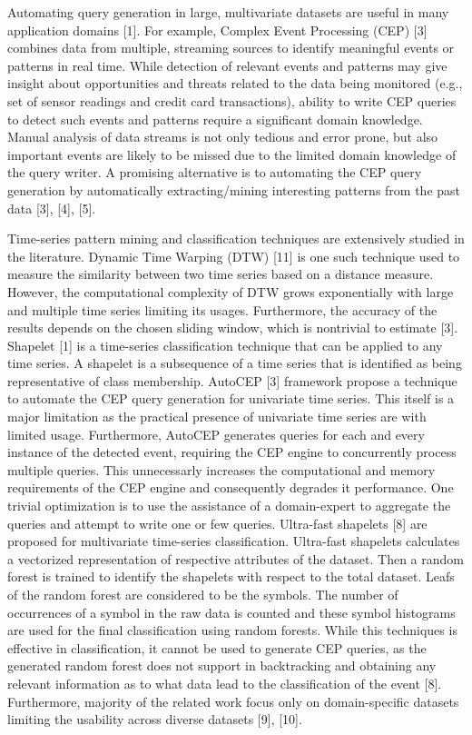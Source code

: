 \documentclass[conference]{IEEEtran}  %
\begin{document}
Automating query generation in large, multivariate datasets are useful in many application domains [1]. For example, Complex Event Processing (CEP) [3] combines data from multiple, streaming sources to identify meaningful events or patterns in real time. While detection of relevant events and patterns may give insight about opportunities and threats related to the data being monitored (e.g., set of sensor readings and credit card transactions), ability to write CEP queries to detect such events and patterns require a significant domain knowledge. Manual analysis of data streams is not only tedious and error prone, but also important events are likely to be missed due to the limited domain knowledge of the query writer. A promising alternative is to automating the CEP query generation by automatically extracting/mining interesting patterns from the past data [3], [4], [5].

Time-series pattern mining and classification techniques are extensively studied in the literature. Dynamic Time Warping (DTW) [11] is one such technique used to measure the similarity between two time series based on a distance measure. However, the computational complexity of DTW grows exponentially with large and multiple time series limiting its usages. Furthermore, the accuracy of the results depends on the chosen sliding window, which is nontrivial to estimate [3]. Shapelet [1] is a time-series classification technique that can be applied to any time series. A shapelet is a subsequence of a time series that is identified as being representative of class membership. AutoCEP [3] framework propose a technique to automate the CEP query generation for univariate time series. This itself is a major limitation as the practical presence of univariate time series are with limited usage. Furthermore, AutoCEP generates queries for each and every instance of the detected event, requiring the CEP engine to concurrently process multiple queries. This unnecessarly increases the computational and memory requirements of the CEP engine and consequently degrades it performance. One trivial optimization is to use the assistance of a domain-expert to aggregate the queries and attempt to write one or few queries. Ultra-fast shapelets [8] are proposed for multivariate time-series classification. Ultra-fast shapelets calculates a vectorized representation of respective attributes of the dataset. Then a random forest is trained to identify the shapelets with respect to the total dataset. Leafs of the random forest are considered to be the symbols. The number of occurrences of a symbol in the raw data is counted and these symbol histograms are used for the final classification using random forests. While this techniques is effective in classification, it cannot be used to generate CEP queries, as the generated random forest does not support in backtracking and obtaining any relevant information as to what data lead to the classification of the event [8]. Furthermore, majority of the related work focus only on domain-specific datasets limiting the usability across diverse datasets [9], [10].
\end{document}
